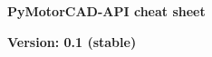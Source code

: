 \documentclass[landscape]{article}
\begin{document}
\raggedright
\footnotesize
\begin{center}
     \Huge{\textbf{PyMotorCAD-API cheat sheet}} 
\end{center}
\begin{center}
	\small{\textbf{Version: 0.1 (stable)}} 
\end{center}
\vspace{-0.25cm}
\noindent\makebox[\linewidth]{\rule{\paperwidth}{2pt}}
\end{document}
